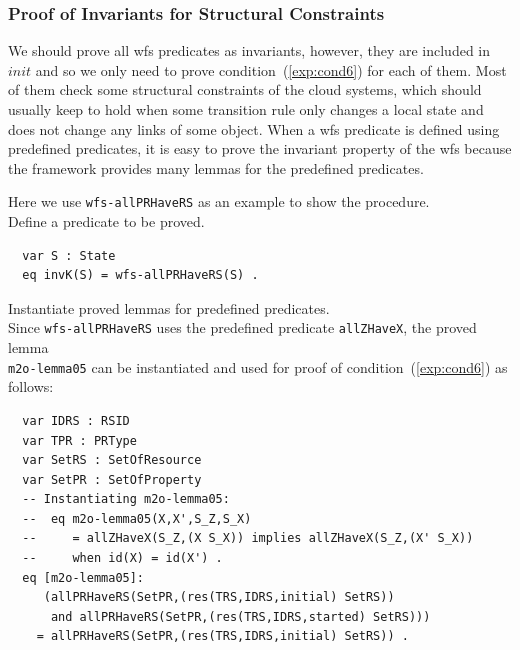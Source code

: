 \documentclass[12pt]{report}
\begin{document}
\subsubsection*{Proof of Invariants for Structural Constraints}
We should prove all wfs predicates as invariants, however, they are
included in $init$ and so we only need to prove
condition~(\ref{exp:cond6}) for each of them. Most of them check some
structural constraints of the cloud systems, which should usually keep
to hold when some transition rule only changes a local state and
does not change any links of some
object. When a wfs predicate is defined using predefined predicates, it
is easy to prove the invariant property of the wfs because the framework
provides many lemmas for the predefined predicates.

Here we use {\tt wfs-allPRHaveRS} as an example to show the procedure.\\

 Define a predicate to be proved. 
\small
\begin{verbatim}
  var S : State
  eq invK(S) = wfs-allPRHaveRS(S) .
\end{verbatim}
\normalsize

 Instantiate proved lemmas for predefined
predicates. \\ Since {\tt wfs-allPRHaveRS} uses the predefined
predicate {\tt allZHaveX}, the proved lemma \\ {\tt m2o-lemma05} can be
instantiated and used for proof of condition~(\ref{exp:cond6}) as
follows:
\small
\begin{verbatim}
  var IDRS : RSID 
  var TPR : PRType
  var SetRS : SetOfResource
  var SetPR : SetOfProperty
  -- Instantiating m2o-lemma05:
  --  eq m2o-lemma05(X,X',S_Z,S_X) 
  --     = allZHaveX(S_Z,(X S_X)) implies allZHaveX(S_Z,(X' S_X))
  --     when id(X) = id(X') .
  eq [m2o-lemma05]:
     (allPRHaveRS(SetPR,(res(TRS,IDRS,initial) SetRS))
      and allPRHaveRS(SetPR,(res(TRS,IDRS,started) SetRS)))
    = allPRHaveRS(SetPR,(res(TRS,IDRS,initial) SetRS)) .
\end{verbatim}
\normalsize
\end{document}

